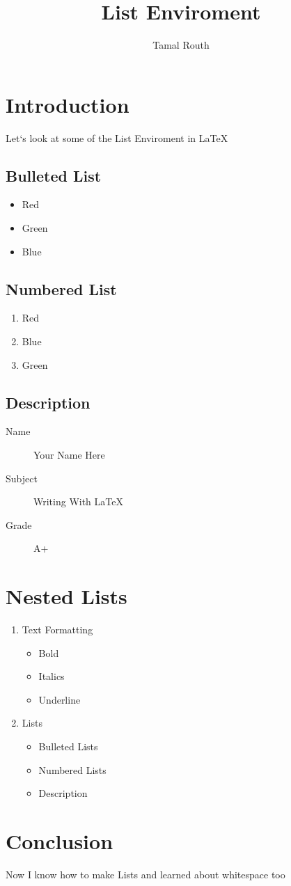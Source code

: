 \documentclass{article}
\title{List Enviroment}
\author{Tamal Routh}
\date{}
\begin{document}
\maketitle

\section{Introduction}
Let`s look at some of the List Enviroment in \LaTeX


\subsection{Bulleted List}

\begin{itemize}
\item Red
\item Green
\item Blue
\end{itemize}


\subsection{Numbered List}

\begin{enumerate}
\item Red
\item Blue
\item Green
\end{enumerate}

\subsection{Description}

\begin{description}
	\item[Name] Your Name Here
	\item[Subject] Writing With \LaTeX
	\item[Grade] A+
\end{description}

\section{Nested Lists}

\begin{enumerate}
\item Text Formatting
	\begin{itemize}
	\item Bold
	\item Italics
	\item Underline
	\end{itemize}
\item Lists
	\begin{itemize}
	\item Bulleted Lists
	\item Numbered Lists
	\item Description
	\end{itemize}
\end{enumerate}

\section{Conclusion}

Now I know how to make Lists and learned about whitespace too
\end{document}

